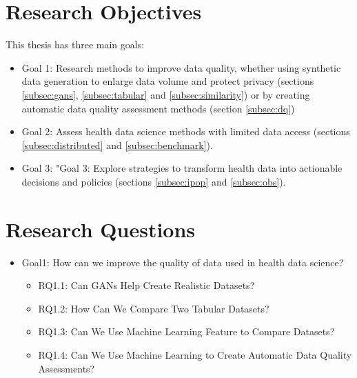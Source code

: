 
\section{Research Objectives}
This thesis has three main goals:


\begin{itemize}
    \item Goal 1: Research methods to improve data quality, whether using synthetic data generation to enlarge data volume and protect privacy (sections \ref{subsec:gans}, \ref{subsec:tabular} and \ref{subsec:similarity}) or by creating automatic data quality assessment methods (section \ref{subsec:dq})

    \item Goal 2: Assess health data science  methods with limited data access (sections \ref{subsec:distributed} and \ref{subsec:benchmark}).

    \item Goal 3:  "Goal 3: Explore strategies to transform health data into actionable decisions and policies (sections  \ref{subsec:ipop} and \ref{subsec:obs}).
\end{itemize}


\section{Research Questions}

\begin{itemize}
    \item Goal1: How can we improve the quality of data used in health data science?
    \begin{itemize}
        \item RQ1.1: Can GANs Help Create Realistic Datasets?
        \item RQ1.2: How Can We Compare Two Tabular Datasets?
        \item RQ1.3: Can We Use Machine Learning Feature to Compare Datasets?
        \item RQ1.4: Can We Use Machine Learning to Create Automatic Data Quality Assessments?
    \end{itemize}
\end{itemize}

